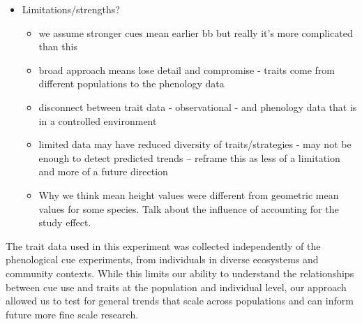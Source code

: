 \documentclass{article}\usepackage[]{graphicx}\usepackage[]{color}
\begin{document}
\begin{itemize}
\item Limitations/strengths?
	\begin{itemize}
	\item we assume stronger cues mean earlier bb but really it's more complicated than this
	\item broad approach means lose detail and compromise - traits come from different populations to the phenology data
	\item disconnect between trait data - observational - and phenology data that is in a controlled environment
	\item limited data may have reduced diversity of traits/strategies - may not be enough to detect predicted trends -- reframe this as less of a limitation and more of a future direction
   \item Why we think mean height values were different from geometric mean values for some species. Talk about the influence of accounting for the study effect. 
	\end{itemize}
\end{itemize}

The trait data used in this experiment was collected independently of the phenological cue experiments, from individuals in diverse ecosystems and community contexts. While this limits our ability to understand the relationships between cue use and traits at the population and individual level, our approach allowed us to test for general trends that scale across populations and can inform future more fine scale research. 

\pagebreak
% 

\end{document}
